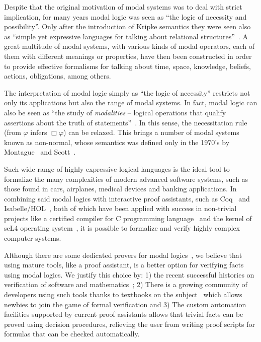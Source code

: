 \documentclass[sigconf,anonymous]{acmart}
\begin{document}
Despite that the original motivation of modal systems was to deal with strict implication, 
for many years modal logic was seen as ``the logic of necessity and possibility''. 
Only after the introduction of Kripke semantics they were seen also as ``simple yet
expressive languages for talking about relational structures''~\cite{Blackburn-ModalLogics}. 
A great multitude of modal systems, with various kinds of modal operators, each of them with 
different meanings or properties, have then been constructed in order to provide effective
formalisms for talking about time, space, knowledge, beliefs, actions, 
obligations, among others.

The interpretation of modal logic simply as ``the logic of necessity'' restricts 
not only its applications but also the range of modal systems. In fact, modal logic 
can also be seen as ``the study of \emph{modalities} -- logical operations that qualify 
assertions about the truth of statements''~\cite{Goldblatt-MathofModality}. In this sense, 
the necessitation rule (from $\varphi$ infers $\Box\varphi$) can be relaxed. This brings 
a number of modal systems known as non-normal, whose semantics was defined only in the 
1970's by Montague~\cite{Montague1970} and Scott~\cite{Scott_AdviceModal1970}.

Such wide range of highly expressive logical languages is the ideal tool to 
formalize the many complexities of modern advanced software systems, 
such as those found in cars, airplanes, medical devices and banking applications.
In combining said modal logics with interactive proof assistants,
such as Coq~\cite{manual_coq} and Isabelle/HOL~\cite{manual_isabelle}, both of
which have been applied with success in non-trivial projects like a certified compiler 
for C programming language~\cite{Leroy09} and the kernel of seL4 operating
system~\cite{Klein10}, it is possible to formalize and verify highly complex computer
systems.

Although there are some dedicated provers for modal logics~\cite{Gleissner17,Mora11},
we believe that using mature tools, like a proof assistant, is a better option for
verifying facts using modal logics. We justify this choice by: 1) the recent
successful histories on verification of software and
mathematics~\cite{Leroy09,Klein10,Gonthier13,Gonthier08}; 2) There is a growing
community of developers using such tools thanks to 
textbooks on the subject~\cite{Nipkow14,Bertot10,Chlipala13} which allows
newbies to join the game of formal verification and 3) The custom automation
facilities supported by current proof assistants allows that trivial facts can
be proved using decision procedures, relieving the user from writing proof
scripts for formulas that can be checked automatically.
\end{document}
